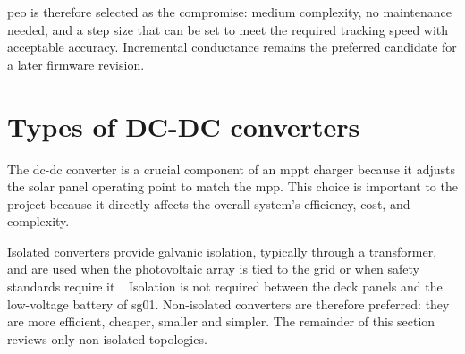         \ac{peo} is therefore selected as the compromise: medium complexity, no maintenance needed, and a step size that can be set to meet the required tracking speed with acceptable accuracy. Incremental conductance remains the preferred candidate for a later firmware revision.

\section{Types of DC-DC converters}
    The \acs{dc}-\acs{dc} converter is a crucial component of an \acs{mppt} charger because it adjusts the solar panel operating point to match the \ac{mpp}. This choice is important to the project because it directly affects the overall system's efficiency, cost, and complexity.

    Isolated converters provide galvanic isolation, typically through a transformer, and are used when the photovoltaic array is tied to the grid or when safety standards require it~\cite{Review_Isolated_Non_isolated_DC_DC_Converters_MVDC_2021,flexpower_isolated_vs_nonisolated_2025}. Isolation is not required between the deck panels and the low-voltage battery of \ac{sg01}. Non-isolated converters are therefore preferred: they are more efficient, cheaper, smaller and simpler. The remainder of this section reviews only non-isolated topologies.

